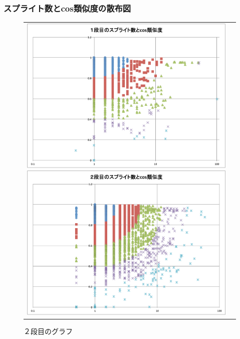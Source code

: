 \documentclass[twocolumn,9pt,a4paper]{jsarticle}
\begin{document}
\subsubsection{スプライト数とcos類似度の散布図}
\begin{figure}[ht]
 \begin{tabular}{cc}
 	\begin{minipage}[t]{0.45\hsize}
	 \centering
	 \includegraphics[keepaspectratio, scale = 0.15]{graph_1_splite.pdf}
	 \caption{１段目のグラフ}
	 \label{first_splite}
	\end{minipage}
        \begin{minipage}[t]{0.45\hsize}
	 \centering
	 \includegraphics[keepaspectratio, scale = 0.15]{graph_2_splite.pdf}
	 \caption{２段目のグラフ}
	 \label{second_splite}

\end{minipage}
\end{tabular}
\end{figure}
\end{document}
